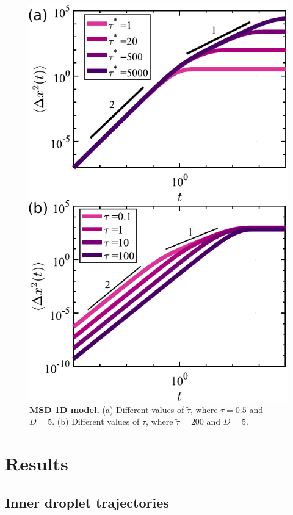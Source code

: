 \documentclass[%
10pt,
superscriptaddress,
twocolumn,
 amsmath,amssymb,
 aps,prx,
]{revtex4-2}
\begin{document}
\begin{figure}
  \includegraphics[width=\columnwidth]{model-msd-illustration}
  \caption{
  \textbf{MSD 1D model.}
  (a) Different values of $\tilde{\tau}$, where $\tau=0.5$ and $D=5$.
  (b) Different values of $\tau$, where $\tilde{\tau}=200$ and $D=5$.
  }
  \label{fig:msd-1d-model}
\end{figure}

\section{Results}

\subsection{Inner droplet trajectories}
\end{document}
